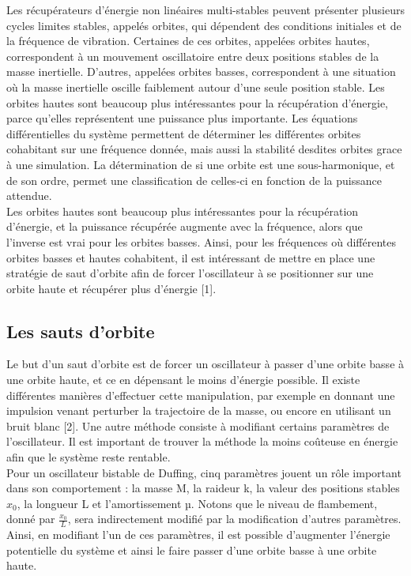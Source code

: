 \documentclass[a4paper, french, 12pt, titlepage]{article}
\begin{document}
Les récupérateurs d'énergie non linéaires multi-stables peuvent présenter plusieurs cycles limites stables, appelés orbites, qui dépendent des conditions initiales et de la fréquence de vibration.
 Certaines de ces orbites, appelées orbites hautes, correspondent à un mouvement oscillatoire entre deux positions stables de la masse inertielle.
  D'autres, appelées orbites basses, correspondent à une situation où la masse inertielle oscille faiblement autour d'une seule position stable.
   Les orbites hautes sont beaucoup plus intéressantes pour la récupération d'énergie, parce qu'elles représentent une puissance plus importante. 
   Les équations différentielles du système permettent de déterminer les différentes orbites cohabitant sur une fréquence donnée, mais aussi la stabilité desdites orbites grace à une simulation.
    La détermination de si une orbite est une sous-harmonique, et de son ordre, permet une classification de celles-ci en fonction de la puissance attendue. \\

Les orbites hautes sont beaucoup plus intéressantes pour la récupération d'énergie, et la puissance récupérée augmente avec la fréquence, alors que l'inverse est vrai pour les orbites basses.
 Ainsi, pour les fréquences où différentes orbites basses et hautes cohabitent, il est intéressant de mettre en place une stratégie de saut d'orbite afin de forcer l'oscillateur à se positionner sur une orbite haute et récupérer plus d'énergie [1]. \\


\subsection{Les sauts d'orbite}

Le but d'un saut d'orbite est de forcer un oscillateur à passer d'une orbite basse à une orbite haute, et ce en dépensant le moins d'énergie possible. 
Il existe différentes manières d'effectuer cette manipulation, par exemple en donnant une impulsion venant perturber la trajectoire de la masse, ou encore en utilisant un bruit blanc [2]. 
Une autre méthode consiste à modifiant certains paramètres de l'oscillateur.
 Il est important de trouver la méthode la moins coûteuse en énergie afin que le système reste rentable. \\

Pour un oscillateur bistable de Duffing, cinq paramètres jouent un rôle important dans son comportement : la masse M, la raideur k, la valeur des positions stables $x_0$, la longueur L et l'amortissement µ. 
Notons que le niveau de flambement, donné par $\frac{x_0}{L}$, sera indirectement modifié par la modification d'autres paramètres. 
Ainsi, en modifiant l'un de ces paramètres, il est possible d'augmenter l'énergie potentielle du système et ainsi le faire passer d'une orbite basse à une orbite haute. \\
\end{document}
